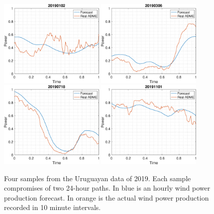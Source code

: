 \documentclass[11pt]{article}
\theoremstyle{definition}
\begin{document}
\begin{figure}[H]
\centering
\includegraphics[width=0.45\textwidth]{plots/5.eps}
\includegraphics[width=0.45\textwidth]{plots/245.eps}\\
\includegraphics[width=0.45\textwidth]{plots/661.eps}
\includegraphics[width=0.45\textwidth]{plots/805.eps}
\caption{Four samples from the Uruguayan data of 2019. Each sample compromises of two 24-hour paths. In blue is an hourly wind power production forecast. In orange is the actual wind power production recorded in 10 minute intervals.}
  \label{fig:sample_data}
\end{figure}
\end{document}
